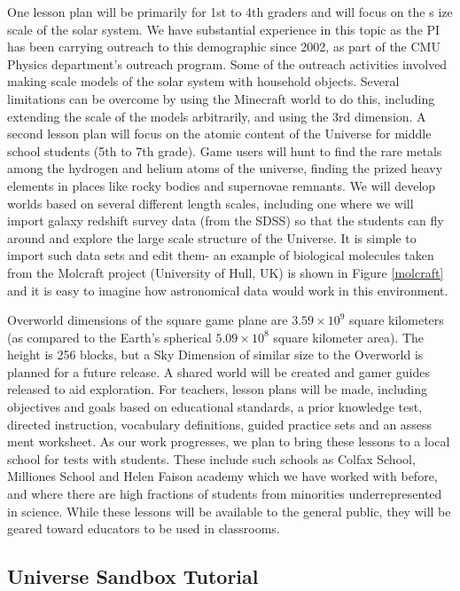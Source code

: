 \documentclass[12pt]{article}
\begin{document}
\begin{small}
One lesson plan will be primarily for 1st to 4th graders and will focus on the s
ize scale of the solar system.
We have substantial experience in this topic as the PI has been
carrying outreach to this demographic since 2002, as part of the CMU
Physics department's outreach program. Some of the outreach activities
involved making scale models of the solar system with household objects. 
Several limitations can be overcome by using the Minecraft world to do this, 
including  extending the scale of the models arbitrarily, and using the 
3rd dimension.
 A second lesson plan will focus on the atomic content of 
the Universe for middle school students (5th to 7th grade). Game users 
will hunt to  find the rare metals among the hydrogen and helium 
atoms of the universe, finding 
the prized heavy elements in places like rocky bodies and supernovae remnants. 
We will develop worlds based on several different length scales, including
one where we will import galaxy redshift survey data (from the SDSS) so that 
the students can fly around and explore 
the large scale structure of the Universe.
It is simple to import such data sets and edit them- an example
of biological molecules taken 
from the Molcraft project (University of Hull, UK) is shown in Figure 
\ref{molcraft} and it is easy to imagine how astronomical data would work
in this environment.


Overworld dimensions of the square game plane are $3.59 \times 10^{9}$
 square kilometers 
(as compared to the Earth’s spherical $5.09 \times 10^{8}$
 square kilometer area). 
The height  is 256 blocks, but a Sky Dimension of similar size to the 
Overworld is 
planned for a future release. A shared world will be created and gamer guides 
released to aid exploration. For teachers, lesson plans will be made, 
including 
objectives and goals based on educational standards, a prior knowledge test, 
directed instruction, vocabulary definitions, guided practice sets and an assess
ment 
worksheet. As our work progresses, we plan to bring these lessons to a local 
school 
for tests with students.
These include such schools as Colfax School, Milliones School and Helen Faison
academy which we have worked with before, and where there are high fractions
of students from minorities underrepresented in science.
 While these lessons will be available to the 
general public, they will be geared toward educators to be used in classrooms.

\subsection{Universe Sandbox Tutorial}



\end{small}
\end{document}
